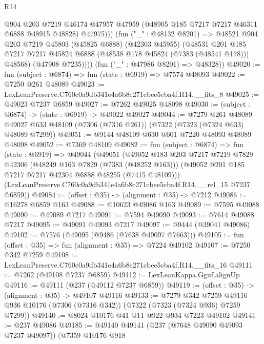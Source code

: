 \begin{lexlean}{R14}
\begin{coremodule}
                @904
                @203
                @7219
                @46174
                @47957
                @47959
                (@48905 @185 @7217 @7217 @46311 @6888 @48915 @48828)
                @47975)))
          (fun ("_" : @48132 @8201) =>
          @48521
            @904
            @203
            @7219
            @45803
            (@45825 @6888)
            (@42303 @45955)
            (@48531
              @201
              @185
              @7217
              @7217
              @45824
              @6888
              (@48538 @178 @45824 (@7383 (@48541 @178)))
              @48568)
            (@47908 @7235))))
      (fun ("_" : @47986 @8201) => @48328))
@49020 := fun (subject : @6874) => fun (state : @6919) => @7574 @48093
@49022 := @7250 @261 @48089
@49023 := LexLeanPreserve.C760c0a9db341e4a6b8c271cbee5cba4f.R14.__fits_8
@49025 := @49023 @7237 @6859
@49027 := @7262 @49025 @48098
@49030 := (subject : @6874) -> (state : @6919) -> @49022 @49027
@49044 := @7279
    @261
    @48089
    @49027
    @633
    @48109
    (@7306 (@7316 @261))
    (@7322 (@7323 (@7324 @633) @48089 @7299))
@49051 := @9144 @48109 @630 @601 @7220 @48093 @48089 @48098
@49052 := @7369 @48109
@49082 := fun (subject : @6874) =>
  fun (state : @6919) =>
  @49044
    (@49051
      (@49052
        @183
        @203
        @7217
        @7219
        @7829
        @42306
        (@48249 @163 @7829 (@7383 (@48252 @163)))
        (@49052 @201 @185 @7217 @7217 @42304 @6888 @48255 (@7415 @48109)))
      (LexLeanPreserve.C760c0a9db341e4a6b8c271cbee5cba4f.R14.__rel_15 @7237 @6859))
@49084 := (offset : @35) -> (alignment : @35) -> @7212
@49086 := @16278 @6859 @163
@49088 := @10623 @49086 @163
@49089 := @7595 @49088
@49090 := @49089 @7217
@49091 := @7594 @49090
@49093 := @7614 @49088 @7217
@49095 := @49091 @49093 @7217
@49097 := @9444 (@39041 @49086)
@49102 := @7576 (@49095 (@9486 (@7638 @49097 @7663)))
@49105 := fun (offset : @35) => fun (alignment : @35) => @7224 @49102
@49107 := @7250 @342 @7259
@49108 := LexLeanPreserve.C760c0a9db341e4a6b8c271cbee5cba4f.R14.__fits_16
@49111 := @7262 (@49108 @7237 @6859)
@49112 := LexLeanKappa.Gguf.alignUp
@49116 := @49111 (@237 (@49112 @7237 @6859))
@49119 := (offset : @35) -> (alignment : @35) -> @49107 @49116
@49133 := @7279
    @342
    @7259
    @49116
    @936
    @10176
    (@7306 (@7316 @342))
    (@7322 (@7323 (@7324 @936) @7259 @7299))
@49140 := @8024 @10176 @41 @11 @922 @934 @7223 @49102
@49141 := @237 @49086
@49185 := @49140
    @49141
    (@237 (@7648 @49090 @49093 @7237 @49097))
    (@7359
      @10176
      @918

\end{coremodule}
\end{lexlean}
